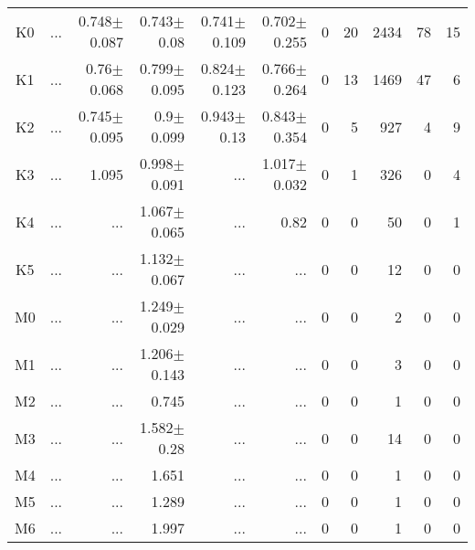 \begin{table}[t]
\begin{center}
\begin{tabular}{c|rrrrr|rrrrr}
K0	&	 ...	&	0.748$\pm$0.087	&	0.743$\pm$0.08	&	0.741$\pm$0.109	&	0.702$\pm$0.255	&	0	&	20	&	2434	&	78	&	15	\\
K1	&	 ...	&	0.76$\pm$0.068	&	0.799$\pm$0.095	&	0.824$\pm$0.123	&	0.766$\pm$0.264	&	0	&	13	&	1469	&	47	&	6	\\
K2	&	 ...	&	0.745$\pm$0.095	&	0.9$\pm$0.099	&	0.943$\pm$0.13	&	0.843$\pm$0.354	&	0	&	5	&	927	&	4	&	9	\\
K3	&	 ...	&	1.095	&	0.998$\pm$0.091	&	 ...	&	1.017$\pm$0.032	&	0	&	1	&	326	&	0	&	4	\\
K4	&	 ...	&	 ...	&	1.067$\pm$0.065	&	 ...	&	0.82	&	0	&	0	&	50	&	0	&	1	\\
K5	&	 ...	&	 ...	&	1.132$\pm$0.067	&	 ...	&	 ...	&	0	&	0	&	12	&	0	&	0	\\
M0	&	 ...	&	 ...	&	1.249$\pm$0.029	&	 ...	&	 ...	&	0	&	0	&	2	&	0	&	0	\\
M1	&	 ...	&	 ...	&	1.206$\pm$0.143	&	 ...	&	 ...	&	0	&	0	&	3	&	0	&	0	\\
M2	&	 ...	&	 ...	&	0.745	&	 ...	&	 ...	&	0	&	0	&	1	&	0	&	0	\\
M3	&	 ...	&	 ...	&	1.582$\pm$0.28	&	 ...	&	 ...	&	0	&	0	&	14	&	0	&	0	\\
M4	&	 ...	&	 ...	&	1.651	&	 ...	&	 ...	&	0	&	0	&	1	&	0	&	0	\\
M5	&	 ...	&	 ...	&	1.289	&	 ...	&	 ...	&	0	&	0	&	1	&	0	&	0	\\
M6	&	 ...	&	 ...	&	1.997	&	 ...	&	 ...	&	0	&	0	&	1	&	0	&	0	\\
    \bottomrule
    \end{tabular}
\end{center}
\end{table}

